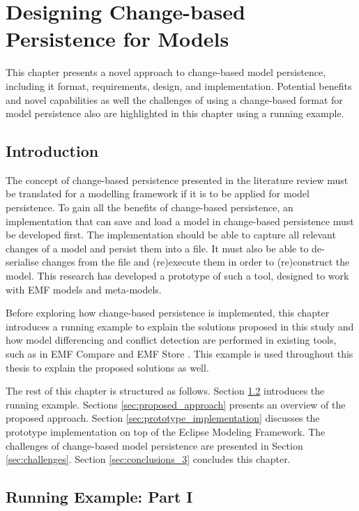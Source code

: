 \chapter{Designing Change-based Persistence for Models}
\label{ch:change_based_model_persistence}

This chapter presents a novel approach to change-based model persistence, including it format, requirements, design, and implementation. Potential benefits and novel capabilities as well the challenges of using a change-based format for model persistence also are highlighted in this chapter using a running example.

\section{Introduction}
\label{Introduction}

The concept of change-based persistence presented in the literature review must be translated for a modelling framework if it is to be applied for model persistence. To gain all the benefits of change-based persistence, an implementation that can save and load a model in change-based persistence must be developed first. The implementation should be able to capture all relevant changes of a model and persist them into a file. It must also be able to de-serialise changes from the file and (re)execute them in order to (re)construct the model. This research has developed a prototype of such a tool, designed to work with EMF models and meta-models.

Before exploring how change-based persistence is implemented, this chapter introduces a running example to explain the solutions proposed in this study and how model differencing and conflict detection are performed in existing tools, such as in EMF Compare \cite{emfcompare2018developer} and EMF Store \cite{emfstore2019what}. This example is used throughout this thesis to explain the proposed solutions as well.

The rest of this chapter is structured as follows. Section \ref{sec:running_example_1} introduces the running example.
Sections \ref{sec:proposed_approach} presents an overview of the proposed approach.
Section \ref{sec:prototype_implementation} discusses the prototype implementation on top of the Eclipse Modeling Framework.
The challenges of change-based model persistence are presented in
Section \ref{sec:challenges}. Section \ref{sec:conclusions_3} concludes this chapter.

\section{Running Example: Part I}
\label{sec:running_example_1}

